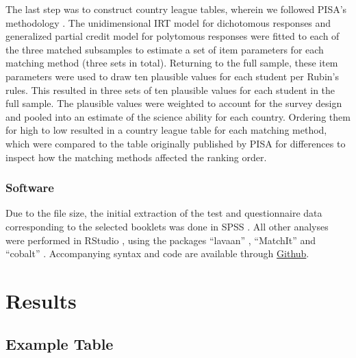 \documentclass{article}
\begin{document}
The last step was to construct country league tables, wherein we followed PISA's methodology \citep{OECD2018}. The unidimensional IRT model for dichotomous responses and generalized partial credit model for polytomous responses were fitted to each of the three matched subsamples to estimate a set of item parameters for each matching method (three sets in total). Returning to the full sample, these item parameters were used to draw ten plausible values for each student per Rubin's rules. This resulted in three sets of ten plausible values for each student in the full sample. The plausible values were weighted to account for the survey design and pooled into an estimate of the science ability for each country. Ordering them for high to low resulted in a country league table for each matching method, which were compared to the table originally published by PISA for differences to inspect how the matching methods affected the ranking order.

\subsubsection{Software} 
Due to the file size, the initial extraction of the test and questionnaire data corresponding to the selected booklets was done in SPSS \citep{spss}. All other analyses were performed in RStudio \citep{Rstudio2020}, using the packages ``lavaan'' \citep{lavaan2012}, ``MatchIt'' \citep{MatchIt2011} and ``cobalt'' \citep{greifer2020cobalt}. Accompanying syntax and code are available through \href{https://github.com/agjtimmers/CitoThesis}{Github}. 

\section{Results}

\subsection{Example Table}
\end{document}
